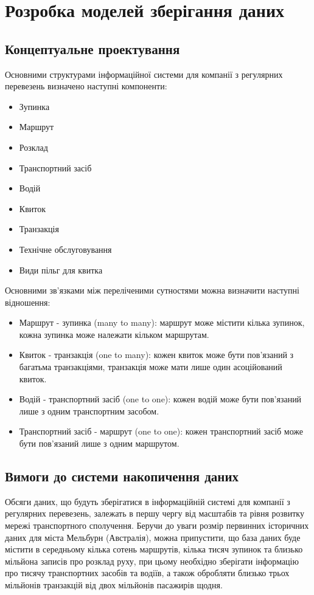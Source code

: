 \documentclass[oneside,14pt]{extarticle}
\begin{document}
\section{Розробка моделей зберігання даних}
\subsection{Концептуальне проектування}
Основними структурами інформаційної системи для компанії з регулярних перевезень визначено наступні компоненти:
\begin{itemize}
\item Зупинка
\item Маршрут
\item Розклад
\item Транспортний засіб
\item Водій
\item Квиток
\item Транзакція
\item Технічне обслуговування
\item Види пільг для квитка
\end{itemize}

Основними зв'язками між переліченими сутностями можна визначити наступні відношення:
\begin{itemize}
\item Маршрут - зупинка (many to many): маршрут може містити кілька зупинок, кожна зупинка може належати кільком маршрутам.
\item Квиток - транзакція (one to many): кожен квиток може бути пов'язаний з багатьма транзакціями, транзакція може мати лише один асоційований квиток.
\item Водій - транспортний засіб (one to one): кожен водій може бути пов'язаний лише з одним транспортним засобом.
\item Транспортний засіб - маршрут (one to one): кожен транспортний засіб може бути пов'язаний лише з одним маршрутом.
\end{itemize}

\subsection{Вимоги до системи накопичення даних}
Обсяги даних, що будуть зберігатися в інформаційній системі для компанії з регулярних перевезень, залежать в першу чергу від масштабів та рівня розвитку мережі транспортного сполучення. Беручи до уваги розмір первинних історичних даних для міста Мельбурн (Австралія), можна припустити, що база даних буде містити в середньому кілька сотень маршрутів, кілька тисяч зупинок та близько мільйона записів про розклад руху, при цьому необхідно зберігати інформацію про тисячу транспортних засобів та водіїв, а також обробляти близько трьох мільйонів транзакцій від двох мільйонів пасажирів щодня.
\end{document}
